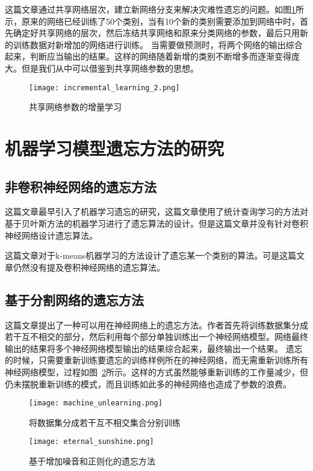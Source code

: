 这篇文章\cite{Sarwar_2020}通过共享网络层次，建立新网络分支来解决灾难性遗忘的问题。如图\ref{fig:incremental_learning_2}所示，原来的网络已经训练了50个类别，当有10个新的类别需要添加到网络中时，首先确定好共享网络的层次，然后冻结共享网络和原来分类网络的参数，最后只用新的训练数据对新增加的网络进行训练。
当需要做预测时，将两个网络的输出综合起来，判断应当输出的结果。这样的网络随着新增的类别不断增多而逐渐变得庞大。但是我们从中可以借鉴到共享网络参数的思想。
\begin{figure}
    \centering
    \texttt{[image: incremental\_learning\_2.png]}
    \caption{共享网络参数的增量学习\cite{Sarwar_2020}}
    \label{fig:incremental_learning_2}
\end{figure}

\section{机器学习模型遗忘方法的研究}
\subsection{非卷积神经网络的遗忘方法}
这篇文章\cite{yinzhicao2015}最早引入了机器学习遗忘的研究，这篇文章使用了统计查询学习的方法对基于贝叶斯方法的机器学习进行了遗忘算法的设计。但是这篇文章并没有针对卷积神经网络设计遗忘算法。

这篇文章\cite{antonio2019}对于k-means机器学习的方法设计了遗忘某一个类别的算法。可是这篇文章仍然没有提及卷积神经网络的遗忘算法。

\subsection{基于分割网络的遗忘方法}
这篇文章\cite{2019arXiv191203817B}提出了一种可以用在神经网络上的遗忘方法。作者首先将训练数据集分成若干互不相交的部分，然后利用每个部分单独训练出一个神经网络模型。网络最终输出的结果将多个神经网络模型输出的结果综合起来，最终输出一个结果。
遗忘的时候，只需要重新训练要遗忘的训练样例所在的神经网络，而无需重新训练所有神经网络模型，过程如图~\ref{fig:machine_unlearning}所示。这样的方式虽然能够重新训练的工作量减少，但仍未摆脱重新训练的模式，而且训练如此多的神经网络也造成了参数的浪费。
\begin{figure}
    \centering
    \texttt{[image: machine\_unlearning.png]}
    \caption{将数据集分成若干互不相交集合分别训练\cite{2019arXiv191203817B}}
    \label{fig:machine_unlearning}
\end{figure}
\begin{figure}
    \centering
    \texttt{[image: eternal\_sunshine.png]}
    \caption{基于增加噪音和正则化的遗忘方法\cite{2019arXiv191203817B}}
    \label{fig:eternal_sunshine}
\end{figure}
